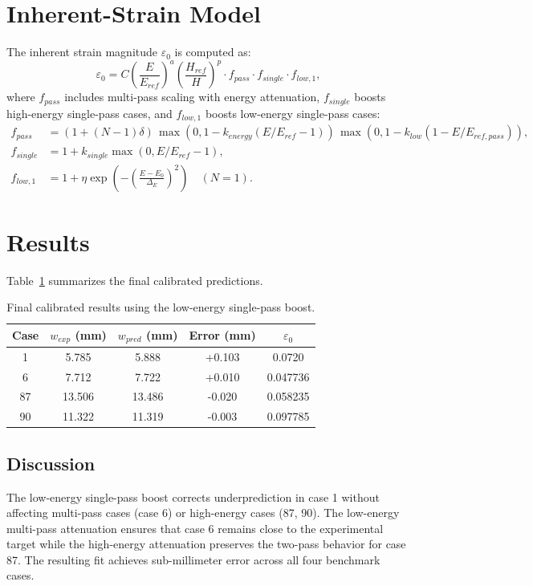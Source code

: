 \documentclass[11pt]{article}
\begin{document}
\section{Inherent-Strain Model}
The inherent strain magnitude $\varepsilon_0$ is computed as:
\begin{equation}
\varepsilon_0 = C \left(\frac{E}{E_{ref}}\right)^a \left(\frac{H_{ref}}{H}\right)^p
\cdot f_{pass} \cdot f_{single} \cdot f_{low,1},
\end{equation}
where $f_{pass}$ includes multi-pass scaling with energy attenuation, $f_{single}$ boosts
high-energy single-pass cases, and $f_{low,1}$ boosts low-energy single-pass cases:
\begin{align}
f_{pass} &= \left(1 + (N-1)\delta\right)\,\max\left(0, 1 - k_{energy}(E/E_{ref}-1)\right)\,\max\left(0, 1 - k_{low}(1 - E/E_{ref,pass})\right),\\
f_{single} &= 1 + k_{single}\max\left(0, E/E_{ref} - 1\right),\\
f_{low,1} &= 1 + \eta\exp\left(-\left(\frac{E - E_0}{\Delta_E}\right)^2\right)\quad (N=1).
\end{align}

\section{Results}
Table~\ref{tab:results} summarizes the final calibrated predictions.
\begin{table}[h]
\centering
\begin{tabular}{ccccc}
\toprule
Case & $w_{exp}$ (mm) & $w_{pred}$ (mm) & Error (mm) & $\varepsilon_0$ \\
\midrule
1  & 5.785 & 5.888 & +0.103 & 0.0720 \\
6  & 7.712 & 7.722 & +0.010 & 0.047736 \\
87 & 13.506 & 13.486 & -0.020 & 0.058235 \\
90 & 11.322 & 11.319 & -0.003 & 0.097785 \\
\bottomrule
\end{tabular}
\caption{Final calibrated results using the low-energy single-pass boost.}
\label{tab:results}
\end{table}

\subsection{Discussion}
The low-energy single-pass boost corrects underprediction in case 1 without affecting multi-pass
cases (case 6) or high-energy cases (87, 90). The low-energy multi-pass attenuation ensures that
case 6 remains close to the experimental target while the high-energy attenuation preserves the
two-pass behavior for case 87. The resulting fit achieves sub-millimeter error across all four
benchmark cases.
\end{document}
